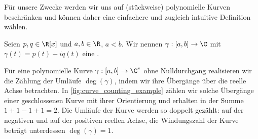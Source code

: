 \documentclass{mythesis}
\begin{document}
Für unsere Zwecke werden wir uns auf (stückweise) polynomielle Kurven beschränken und können daher eine einfachere und zugleich intuitive Definition wählen.

\begin{definition}
    Seien $p, q \in \R[x]$ und $a, b \in \R$, $a < b$.
    Wir nennen $\gamma: [a, b] \to \C$ mit $\gamma(t) = p(t) + iq(t)$ eine .
\end{definition}

Für eine polynomielle Kurve $\gamma: [a,b] \to \C^*$ ohne Nulldurchgang realisieren wir die Zählung der Umläufe $\deg(\gamma)$, indem wir ihre Übergänge über die reelle Achse betrachten.
In \ref{fig:curve_counting_example} zählen wir solche Übergänge einer geschlossenen Kurve mit ihrer Orientierung und erhalten in der Summe $1 + 1 - 1 + 1 = 2$.
Die Umläufe der Kurve werden so doppelt gezählt: auf der negativen und auf der positiven reellen Achse, die Windungszahl der Kurve beträgt unterdessen $\deg(\gamma) = 1$.
\end{document}
